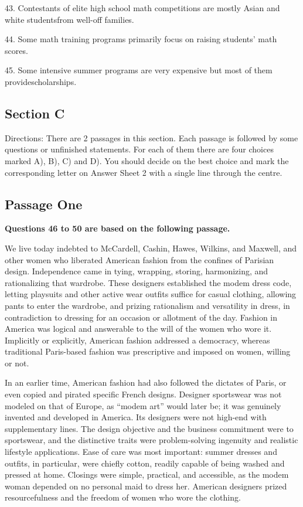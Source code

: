 \documentclass[UTF8,11pt]{ctexart}
\begin{document}
43. Contestants of elite high school math competitions are mostly Asian and white studentsfrom well-off families.


44. Some math training programs primarily focus on raising students' math scores.


45. Some intensive summer programs are very expensive but most of them providescholarships.


\subsection*{\textbf{Section C}}


Directions: There are 2 passages in this section. Each passage is followed by some questions or unfinished statements. For each of them there are four choices marked A), B), C) and D). You should decide on the best choice and mark the corresponding letter on Answer Sheet 2 with a single line through the centre.


\subsection*{Passage One}


\textbf{Questions 46 to 50 are based on the following passage.}


We live today indebted to McCardell, Cashin, Hawes, Wilkins, and Maxwell, and other women who liberated American fashion from the confines of Parisian design. Independence came in tying, wrapping, storing, harmonizing, and rationalizing that wardrobe. These designers established the modem dress code, letting playsuits and other active wear outfits suffice for casual clothing, allowing pants to enter the wardrobe, and prizing rationalism and versatility in dress, in contradiction to dressing for an occasion or allotment of the day. Fashion in America was logical and answerable to the will of the women who wore it. Implicitly or explicitly, American fashion addressed a democracy, whereas traditional Paris-based fashion was prescriptive and imposed on women, willing or not.


In an earlier time, American fashion had also followed the dictates of Paris, or even copied and pirated specific French designs. Designer sportswear was not modeled on that of Europe, as “modem art” would later be; it was genuinely invented and developed in America. Its designers were not high-end with supplementary lines. The design objective and the business commitment were to sportswear, and the distinctive traits were problem-solving ingenuity and realistic lifestyle applications. Ease of care was most important: summer dresses and outfits, in particular, were chiefly cotton, readily capable of being washed and pressed at home. Closings were simple, practical, and accessible, as the modem woman depended on no personal maid to dress her. American designers prized resourcefulness and the freedom of women who wore the clothing.
\end{document}
